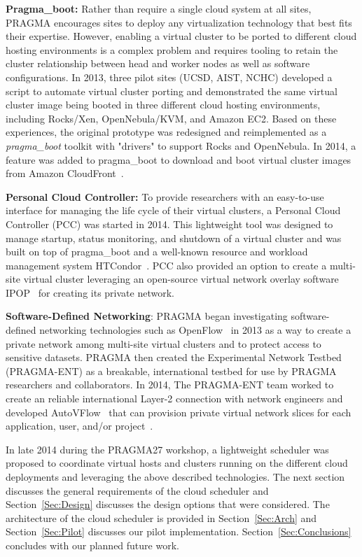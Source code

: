 \documentclass{acm_proc_article-sp}
\begin{document}
\textbf{Pragma\_boot:}  Rather than require a single cloud system at all sites, PRAGMA encourages sites to  deploy any virtualization technology that best fits their expertise. However, enabling a virtual cluster to be ported to different cloud hosting environments is a complex problem and requires tooling to retain the cluster relationship between head and worker nodes as well as software configurations.  In 2013, three pilot sites (UCSD, AIST, NCHC) developed a script to automate virtual cluster porting and demonstrated the same virtual cluster image being booted in three different cloud hosting environments, including Rocks/Xen, OpenNebula/KVM, and Amazon EC2.  Based on these experiences, the original prototype was redesigned and reimplemented as a \textit{pragma\_boot} toolkit with "drivers" to support  Rocks and OpenNebula.  In 2014, a feature was added to pragma\_boot to download and boot virtual cluster images from Amazon CloudFront~\cite{cloudfront}.

\textbf{Personal Cloud Controller:}  To provide researchers with an easy-to-use interface for managing the life cycle of their virtual clusters, a Personal Cloud Controller (PCC)  was started in 2014. This lightweight tool was designed to manage startup, status monitoring, and shutdown of a virtual cluster and was built on top of pragma\_boot and a well-known resource and workload management system HTCondor~\cite{condor}.   PCC also provided an option to create a multi-site virtual cluster leveraging an open-source virtual network overlay software IPOP~\cite{ipop} for creating its private network.  

\textbf{Software-Defined Networking}:   PRAGMA began investigating software-defined networking technologies such as OpenFlow~\cite{openflow} in 2013 as a way to create a private network among multi-site virtual clusters and to protect access to sensitive datasets.  PRAGMA then created the Experimental Network Testbed (PRAGMA-ENT) as a breakable, international testbed for use by PRAGMA researchers and collaborators.  In 2014, The PRAGMA-ENT team worked to create an reliable international Layer-2 connection with network engineers and developed AutoVFlow~\cite{autovflow} that can provision private virtual network slices for each application, user, and/or project~\cite{pragmaReport2014}.  

In late 2014 during the PRAGMA27 workshop, a lightweight scheduler was proposed to coordinate virtual hosts and clusters running on the different cloud deployments  and leveraging the above described technologies.  The next section discusses the general requirements of the cloud scheduler and Section~\ref{Sec:Design} discusses the design options that were considered.  The architecture of the cloud scheduler is provided in Section~\ref{Sec:Arch} and Section~\ref{Sec:Pilot} discusses our pilot implementation.  Section~\ref{Sec:Conclusions} concludes with our planned future work.  
\end{document}
